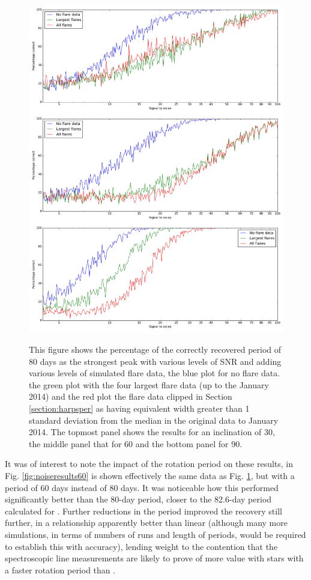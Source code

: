 \begin{figure}[!htbp]
\begin{center}
\includegraphics[scale=0.25]{Figures/Np80.png} \\
\end{center}
\caption{This figure shows the percentage of the correctly recovered period of 80 days as the strongest peak with
  various levels of SNR and adding various levels of simulated flare data, the blue plot for no flare data. the green
  plot with the four largest flare data (up to the January 2014) and the red plot the flare data clipped in Section
  \ref{section:harpsper} as having equivalent width greater than 1 standard deviation from the median in the original
  data to January 2014.  The topmost panel shows the results for an inclination of 30{\degree}, the middle panel that
  for 60{\degree} and the bottom panel for 90{\degree}.}
\protect\label{fig:noiseresults}
\end{figure}

It was of interest to note the impact of the rotation period on these results, in Fig. \ref{fig:noiseresults60} is shown
effectively the same data as Fig. \ref{fig:noiseresults}, but with a period of 60 days instead of 80 days. It was
noticeable how this performed significantly better than the 80-day period, closer to the 82.6-day period calculated for
\prox. Further reductions in the period improved the recovery still further, in a relationship apparently better than
linear (although many more simulations, in terms of numbers of runs and length of periods, would be required to
establish this with accuracy), lending weight to the contention that the spectroscopic line measurements are likely to
prove of more value with stars with a faster rotation period than \prox.

